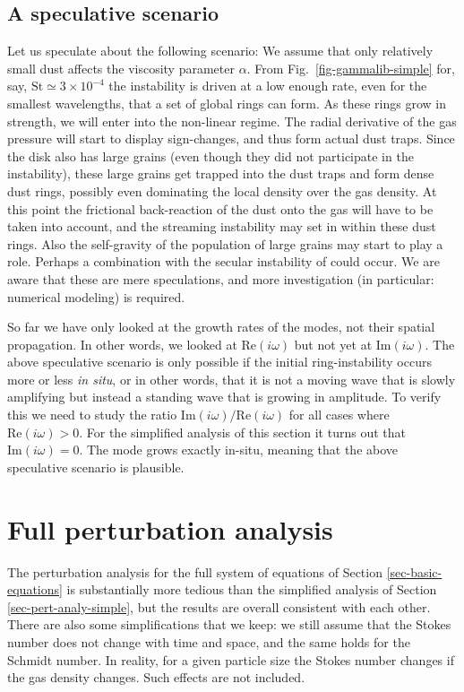 \documentclass{aa}
\newcommand{\revisedtwo}[1]{{#1}}
\begin{document}
\subsection{A speculative scenario}
\label{sec-two-stage-scenario}
%
Let us speculate about the following scenario: We assume that only relatively
small dust affects the viscosity parameter $\alpha$. From
Fig.~\ref{fig-gammalib-simple} for, say, $\mathrm{St}\simeq 3\times 10^{-4}$ the
instability is driven at a low enough rate, even for the smallest wavelengths,
that a set of global rings can form. As these rings grow in strength, we will
enter into the non-linear regime. The radial derivative of the gas pressure will
start to display sign-changes, and thus form actual dust traps. Since the disk
also has large grains (even though they did not participate in the instability),
these large grains get trapped into the dust traps and form dense dust rings,
possibly even dominating the local density over the gas density.
\revisedtwo{At this point the frictional back-reaction of the dust onto the 
  gas will have to be taken into account, and the streaming instability
  \citep{2007ApJ...662..627J} may set in within these dust rings. Also}
the self-gravity of the population of large grains may start to play a role.
Perhaps a combination with the secular instability of
\citet{2016AJ....152..184T} could occur.  We are aware that these are mere
speculations, and more investigation (in particular: numerical modeling) is
required.

So far we have only looked at the growth rates of the modes, not their spatial
propagation. In other words, we looked at $\mathrm{Re}(i\omega)$ but not yet at
$\mathrm{Im}(i\omega)$. The above speculative scenario is only possible if the
initial ring-instability occurs more or less {\em in situ}, or in other words,
that it is not
a moving wave that is slowly amplifying but instead a standing wave that is
growing in amplitude. To verify this we need to study the ratio
$\mathrm{Im}(i\omega)/\mathrm{Re}(i\omega)$ for all cases where
$\mathrm{Re}(i\omega)>0$. For the simplified analysis of this section it
turns out that $\mathrm{Im}(i\omega)=0$. The mode grows exactly
in-situ, meaning that the above speculative scenario is plausible. 






\section{Full perturbation analysis}
\label{sec-pert-analy-full}
%
The perturbation analysis for the full system of equations of Section
\ref{sec-basic-equations} is substantially more tedious than the simplified
analysis of Section \ref{sec-pert-analy-simple}, but the results are overall
consistent with each other. There are also some simplifications that we keep:
we still assume that the Stokes number does not change with time and space, and
the same holds for the Schmidt number. In reality, for a given particle size
the Stokes number changes if the gas density changes. Such effects are not
included.
\end{document}
